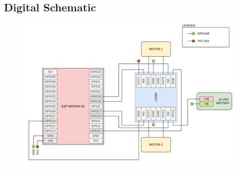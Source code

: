 \documentclass[journal,10pt]{article}
\begin{document}
\subsection{Digital Schematic}
\begin{center}
\begin{figure}[htbp]
        \centering
        \includegraphics[scale = 0.5]{3.png}
\end{figure}  
\end{center}
\end{document}
